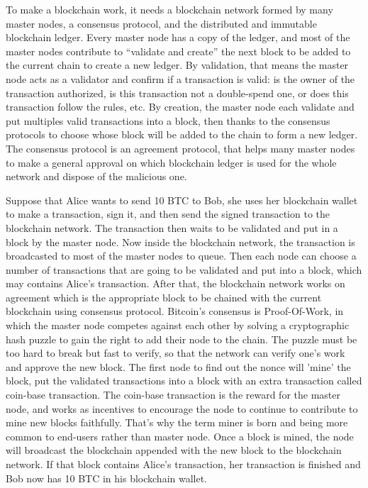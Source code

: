 To make a blockchain work, it needs a blockchain network formed by many master nodes, a consensus protocol, and the distributed and immutable blockchain ledger. Every master node has a copy of the ledger, and most of the master nodes contribute to “validate and create” the next block to be added to the current chain to create a new ledger. By validation, that means the master node acts as a validator and confirm if a transaction is valid: is the owner of the transaction authorized, is this transaction not a double-spend one, or does this transaction follow the rules, etc. By creation, the master node each validate and put multiples valid transactions into a block, then thanks to the consensus protocols to choose whose block will be added to the chain to form a new ledger. The consensus protocol is an agreement protocol, that helps many master nodes to make a general approval on which blockchain ledger is used for the whole network and dispose of the malicious one.

Suppose that Alice wants to send 10 BTC to Bob, she uses her blockchain wallet to make a transaction, sign it, and then send the signed transaction to the blockchain network. The transaction then waits to be validated and put in a block by the master node. Now inside the blockchain network, the transaction is broadcasted to most of the master nodes to queue. Then each node can choose a number of transactions that are going to be validated and put into a block, which may contains Alice's transaction. After that, the blockchain network works on agreement which is the appropriate block to be chained with the current blockchain using consensus protocol. Bitcoin's consensus is Proof-Of-Work, in which the master node competes against each other by solving a cryptographic hash puzzle to gain the right to add their node to the chain. The puzzle must be too hard to break but fast to verify, so that the network can verify one's work and approve the new block. The first node to find out the nonce will 'mine' the block, put the validated transactions into a block with an extra transaction called coin-base transaction. The coin-base transaction is the reward for the master node, and works as incentives to encourage the node to continue to contribute to mine new blocks faithfully. That's why the term miner is born and being more common to end-users rather than master node. Once a block is mined, the node will broadcast the blockchain appended with the new block to the blockchain network. If that block contains Alice's transaction, her transaction is finished and Bob now has 10 BTC in his blockchain wallet.

